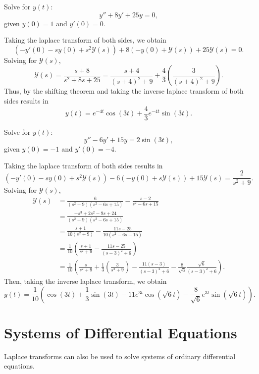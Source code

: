 \begin{example}
    Solve for $y(t)$:
    $$y''+8y'+25y=0,$$
    given $y(0)=1$ and $y'(0)=0$.
\end{example}
\begin{soln}
    Taking the laplace transform of both sides, we obtain
    $$\left(-y'(0)-sy(0)+s^2\mathcal{Y}(s)\right)+8\left( -y(0)+\mathcal{Y}(s)\right)+25\mathcal{Y}(s)=0.$$
    Solving for $\mathcal{Y}(s)$,
    $$\mathcal{Y}(s) = \frac{s+8}{s^2+8s+25} = \frac{s+4}{(s+4)^2+9}+\frac{4}{3}\left(\frac{3}{(s+4)^2+9}\right).$$
    Thus, by the \alert{shifting theorem} and taking the inverse laplace transform of
    both sides results in
    $$y(t) = e^{-4t}\cos(3t) + \frac{4}{3}e^{-4t}\sin(3t).$$
\end{soln}

\begin{example}
    Solve for $y(t)$:
    $$y''-6y'+15y = 2\sin(3t),$$
    given $y(0)=-1$ and $y'(0)=-4$.
\end{example}
\begin{soln}
    Taking the laplace transform of both sides results in
    $$\left( -y'(0)-sy(0)+s^2\mathcal{Y}(s)\right)-6\left( -y(0)+s\mathcal{Y}(s)\right)+15\mathcal{Y}(s) = \frac{2}{s^2+9}.$$
    Solving for $\mathcal{Y}(s)$,
    \begin{align*}
        \mathcal{Y}(s) &= \frac{6}{(s^2+9)(s^2-6s+15)}-\frac{s-2}{s^2-6s+15} \\
                       &= \frac{-s^3+2s^2-9s+24}{(s^2+9)(s^2-6s+15)} \\
                       &= \frac{s+1}{10(s^2+9)}-\frac{11s-25}{10(s^2-6s+15)} \\
                       &= \frac{1}{10}\left(\frac{s+1}{s^2+9}-\frac{11s-25}{(s-3)^2+6}\right) \\
                       &= \frac{1}{10}\left( \frac{s}{s^2+9} + \frac{1}{3}\left(\frac{3}{s^2+9}\right)-\frac{11(s-3)}{(s-3)^2+6}-\frac{8}{\sqrt{6}}\frac{\sqrt{6}}{(s-3)^2+6}\right).
    \end{align*}
    Then, taking the inverse laplace transform, we obtain
    $$y(t) = \frac{1}{10}\left( \cos(3t)+\frac{1}{3}\sin(3t)-11e^{3t}\cos(\sqrt{6}t)-\frac{8}{\sqrt{6}}e^{3t}\sin(\sqrt{6}t)\right).$$
\end{soln}

\section{Systems of Differential Equations}
Laplace transforms can also be used to solve systems of ordinary differential
equations.


